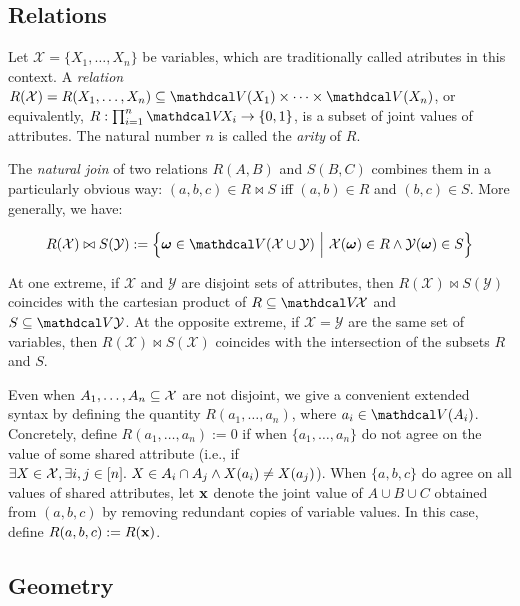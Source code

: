 {\begin{subappendices}
\subsection{Relations}

Let $\mathcal X = \{ X_1, \ldots, X_n \}$ be variables,
which are traditionally called atributes in this context. 
A \emph{relation} $R(\mathcal X) = R(X_1, \ldots, X_n) \subseteq 
\V(X_1) \times \cdots \times \V(X_n)$, or equivalently, $R : \prod_{i=1}^n \V\!X_i \to \{0,1\}$, is a subset of joint values of attributes. 
The natural number $n$ is called the \emph{arity} of $R$. 


The \emph{natural join} of two relations $R(A,B)$ and $S(B,C)$ combines them in a particularly obvious way: $(a,b,c) \in R \bowtie S$ iff $(a,b) \in R$ and $(b,c) \in S$. 
More generally, we have: 

\begin{equation}
    R(\mathcal X) \bowtie S(\mathcal Y)
        := 
        \Big\{
            \boldsymbol\omega \in  \V(\mathcal X \cup \mathcal Y)
            ~\Big|~
            \mathcal X(\boldsymbol\omega) \in R \land
            \mathcal Y(\boldsymbol\omega) \in S
        \Big\}
\end{equation}

At one extreme, if $\mathcal X$ and $\mathcal Y$ are disjoint sets of attributes, then $R(\mathcal X) \bowtie S(\mathcal Y)$ coincides with the cartesian product of $R \subseteq \V \! \mathcal X$ and $S \subseteq \V\mathcal Y$.
At the opposite extreme, if $\mathcal X = \mathcal Y$ are the same set of variables, then $R(\mathcal X) \bowtie S(\mathcal X)$ coincides with the intersection of the subsets $R$ and $S$. 

Even when $A_1, \ldots, A_n \subseteq \mathcal X$ are not disjoint, we give a convenient extended syntax by defining the quantity $R(a_1, \ldots, a_n)$, where $a_i \in \V(A_i)$. 
Concretely, define $R(a_1,\ldots, a_n) := 0$ if when $\{a_1, \ldots, a_n\}$ do not agree on the value of some shared attribute (i.e., if $\exists X \in \mathcal X, \exists i,j \in [n]. ~X \in A_i \cap A_j \land X(a_i) \ne X(a_j)$).
When $\{a,b,c\}$ do agree on all values of shared attributes, let $\mathbf x$ denote the joint value of $A \cup B \cup C$ obtained from $(a,b,c)$ by removing redundant copies of variable values.
In this case, define $R(a,b,c) := R(\mathbf x)$. 


\subsection{Geometry}

    
\end{subappendices}
}

